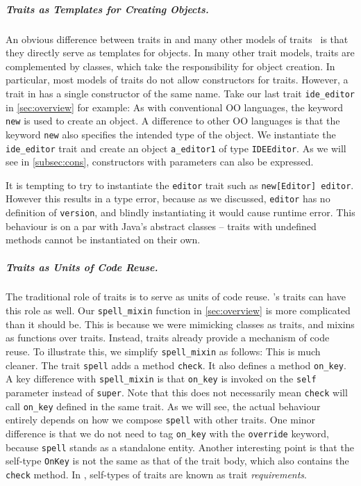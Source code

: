 \subparagraph{Traits as Templates for Creating Objects.} An obvious difference between
traits in \name and many other models of
traits~\cite{scharli2003traits,fisher2004typed,odersky2005scalable} is that they
directly serve as templates for objects. In many other trait models, traits are
complemented by classes, which take the responsibility for object creation. In
particular, most models of traits do not allow constructors for traits. However,
a trait in \name has a single constructor of the same name. Take our last trait
\lstinline{ide_editor} in \cref{sec:overview} for example:
As with conventional OO languages, the keyword \lstinline{new} is used to create
an object. A difference to other OO languages is that the keyword
\lstinline{new} also specifies the intended type of the object. We
instantiate the \lstinline{ide_editor} trait and create an object
\lstinline{a_editor1} of type \lstinline{IDEEditor}. As we will see in
\cref{subsec:cons}, constructors with parameters can also be expressed.

It is tempting to try to instantiate the \lstinline{editor} trait such as
\lstinline{new[Editor] editor}. However this results in a type error, because as
we discussed, \lstinline{editor} has no definition of \lstinline{version}, and
blindly instantiating it would cause runtime error. This behaviour is on a par
with Java's abstract classes -- traits with undefined methods cannot be
instantiated on their own.

\subparagraph{Traits as Units of Code Reuse.}
The traditional role of traits is to serve as units of code reuse. \name's traits
can have this role as well.
Our \lstinline{spell_mixin} function in \cref{sec:overview} is more complicated than it should be.
This is because we were mimicking classes as traits, and
mixins as functions over traits. Instead, traits already provide a mechanism of
code reuse. To illustrate this, we simplify \lstinline{spell_mixin} as follows:
This is much cleaner. The trait \lstinline{spell} adds a method
\lstinline{check}. It also defines a method \lstinline{on_key}.
A key difference with \lstinline{spell_mixin} is that \lstinline{on_key} is invoked on the \lstinline{self}
parameter instead of \lstinline{super}. Note that this does not necessarily mean \lstinline{check} will call \lstinline{on_key}
defined in the same trait. As we will see, the actual behaviour entirely depends on how we compose \lstinline{spell}
with other traits. One minor difference is that we do not need to tag \lstinline{on_key}
with the \lstinline{override} keyword, because \lstinline{spell} stands as a standalone entity.
Another interesting point is that the self-type \lstinline{OnKey}
is not the same as that of the trait body, which also contains the \lstinline{check} method.
In \name, self-types of traits are known as trait \emph{requirements}.


